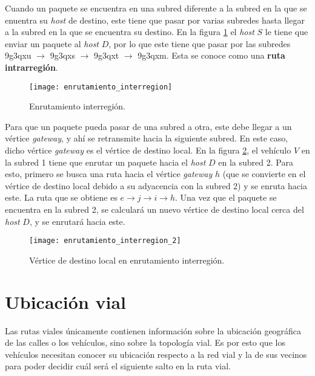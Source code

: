 Cuando un paquete se encuentra en una subred diferente a la subred en la que se
enuentra su \textit{host} de destino, este tiene que pasar por varias subredes
hasta llegar a la subred en la que se encuentra su destino. En la figura
\ref{fig:enrutamiento_interregion} el \textit{host} $S$ le tiene que enviar un
paquete al \textit{host} $D$, por lo que este tiene que pasar por las subredes
9g3qxu $\rightarrow$ 9g3qxs $\rightarrow$ 9g3qxt $\rightarrow$ 9g3qxm. Esta se
conoce como una \textbf{ruta intrarregión}.

\begin{figure}[th!]
\centering
\texttt{[image: enrutamiento\_interregion]}
\decoRule
\caption[Enrutamiento interregión]{Enrutamiento interregión.}
\label{fig:enrutamiento_interregion}
\end{figure}

Para que un paquete pueda pasar de una subred a otra, este debe llegar a un
vértice \textit{gateway}, y ahí se retransmite hacia la siguiente subred. En
este caso, dicho vértice \textit{gateway} es el vértice de destino local. En la
figura \ref{fig:enrutamiento_interregion_2}, el vehículo $V$ en la subred 1
tiene que enrutar un paquete hacia el \textit{host} $D$ en la subred 2.
Para esto, primero se busca una ruta hacia el vértice \textit{gateway} $h$ (que
se convierte en el vértice de destino local debido a su adyacencia con la
subred 2) y se enruta hacia este. La ruta que se obtiene es $e
\rightarrow j \rightarrow i \rightarrow h$. Una vez que el paquete se encuentra
en la subred 2, se calculará un nuevo vértice de destino local cerca del
\textit{host} $D$, y se enrutará hacia este.


\begin{figure}[th!]
\centering
\texttt{[image: enrutamiento\_interregion\_2]}
\decoRule
\caption[Vértice de destino local en enrutamiento interregión]{Vértice de
destino local en enrutamiento interregión.}
\label{fig:enrutamiento_interregion_2}
\end{figure}

\section{Ubicación vial}
\label{sec:ubicacion_vial}

Las rutas viales únicamente contienen información sobre la ubicación geográfica
de las calles o los vehículos, sino sobre la topología vial. Es por esto que los
vehículos necesitan conocer su ubicación respecto a la red vial y la de sus
vecinos para poder decidir cuál será el siguiente salto en la ruta vial.

